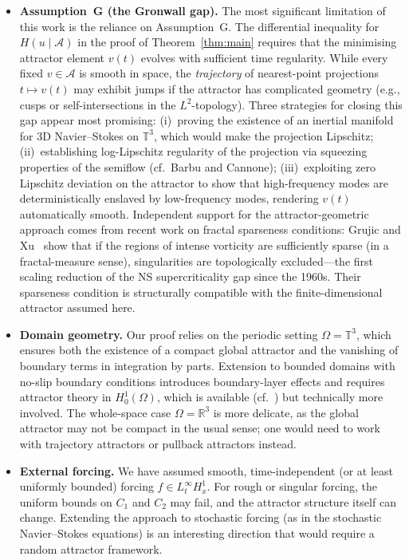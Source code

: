 \documentclass[12pt,a4paper]{article}
\theoremstyle{definition}
\theoremstyle{plain}
\theoremstyle{remark}
\begin{document}
\begin{itemize}
    \item \textbf{Assumption~G (the Gronwall gap).} The most significant limitation of this work is the reliance on Assumption~G. The differential inequality for $H(u\mid\mathcal{A})$ in the proof of Theorem~\ref{thm:main} requires that the minimising attractor element $v(t)$ evolves with sufficient time regularity. While every fixed $v \in \mathcal{A}$ is smooth in space, the \emph{trajectory} of nearest-point projections $t \mapsto v(t)$ may exhibit jumps if the attractor has complicated geometry (e.g., cusps or self-intersections in the $L^2$-topology). Three strategies for closing this gap appear most promising: (i)~proving the existence of an inertial manifold for 3D Navier--Stokes on $\mathbb{T}^3$, which would make the projection Lipschitz; (ii)~establishing log-Lipschitz regularity of the projection via squeezing properties of the semiflow (cf.\ Barbu and Cannone); (iii)~exploiting zero Lipschitz deviation on the attractor to show that high-frequency modes are deterministically enslaved by low-frequency modes, rendering $v(t)$ automatically smooth.
    Independent support for the attractor-geometric approach comes from recent work on fractal sparseness conditions: Grujic and Xu~\cite{GrujicXu2025} show that if the regions of intense vorticity are sufficiently sparse (in a fractal-measure sense), singularities are topologically excluded---the first scaling reduction of the NS supercriticality gap since the 1960s. Their sparseness condition is structurally compatible with the finite-dimensional attractor assumed here.

    \item \textbf{Domain geometry.} Our proof relies on the periodic setting $\Omega = \mathbb{T}^3$, which ensures both the existence of a compact global attractor \cite{FoiasManleyRosaTemam2001} and the vanishing of boundary terms in integration by parts. Extension to bounded domains with no-slip boundary conditions introduces boundary-layer effects and requires attractor theory in $H^1_0(\Omega)$, which is available (cf.\ \cite{Temam2001}) but technically more involved. The whole-space case $\Omega = \mathbb{R}^3$ is more delicate, as the global attractor may not be compact in the usual sense; one would need to work with trajectory attractors or pullback attractors instead.

    \item \textbf{External forcing.} We have assumed smooth, time-independent (or at least uniformly bounded) forcing $f \in L^\infty_t H^1_x$. For rough or singular forcing, the uniform bounds on $C_1$ and $C_2$ may fail, and the attractor structure itself can change. Extending the approach to stochastic forcing (as in the stochastic Navier--Stokes equations) is an interesting direction that would require a random attractor framework.


\end{itemize}
\end{document}

